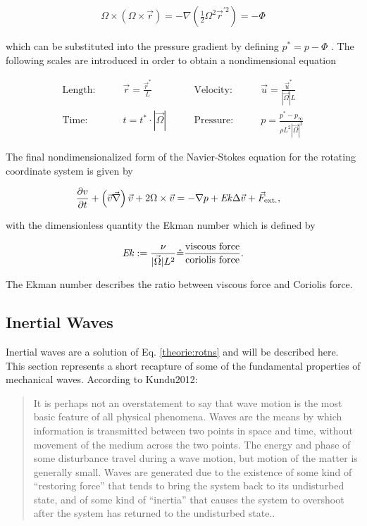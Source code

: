 \begin{align}
    \Omega \times (\Omega \times \vec{r}) = - \nabla \left(\frac{1}{2}\Omega^2\vec{r}^{'2}\right) = -\Phi
\end{align}

which can be substituted into the pressure gradient by defining $p^* = p - \Phi$ \citep{tritton88}.
\newpage
The following scales are introduced in order to obtain a nondimensional equation

\begin{align}
    \text{Length:}\qquad &  \vec{r} = \frac{\vec{r}^*}{L}  &
    \qquad \text{Velocity:}\qquad& \vec{u} =  \frac{\vec{u}^*}{|\vec{\Omega}|L}\\
    \text{Time:}  \qquad & t = t^* \cdot |\vec{\Omega}| &
    \qquad  \text{Pressure:}\qquad & p = \frac{p^* - p_\infty}{\rho L^2{|\vec{\Omega}|}^2}
\end{align}

The final nondimensionalized form of the Navier-Stokes equation for the rotating coordinate system is given by

\begin{align}
    \label{theorie:rotns}
    \pdn[v]{t}+ \left(\vec{v}  \vec{\nabla}\right) \vec{v} + 2\Omega \times \vec{v}  &= -  \nabla p + \Ekman \Delta \vec{v} + \vec{F}_{\text{ext.}},
\end{align}

with the dimensionless quantity the Ekman number which is defined by

\begin{align}
    \mbox{\textit{Ek}} := \frac{\nu}{|\vec{\Omega}| L^2} \hat{=} \frac{\text{viscous force}}{\text{coriolis force}}.
\end{align}

The Ekman number describes the ratio between viscous force and  Coriolis force.

\subsection{Inertial Waves}

Inertial waves are a solution of Eq. \ref{theorie:rotns} and will be described here.
This section represents a short recapture of some of the fundamental properties of mechanical waves. According to {Kundu2012}:

\begin{quote}
It is perhaps not an overstatement to say that wave motion is the most basic feature
of all physical phenomena. Waves are the means by which information is transmitted
between two points in space and time, without movement of the medium across the
two points. The energy and phase of some disturbance travel during a wave motion,
but motion of the matter is generally small. Waves are generated due to the existence of
some kind of “restoring force” that tends to bring the system back to its undisturbed
state, and of some kind of “inertia” that causes the system to overshoot after the
system has returned to the undisturbed state.\cite[p.194]{Kundu2012}.
\end{quote}

